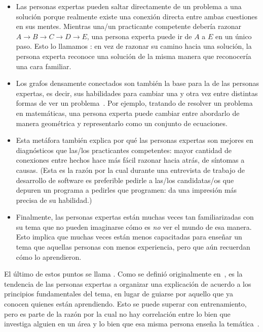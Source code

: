 \begin{itemize}

\item
  Las personas expertas pueden saltar directamente de un problema a una solución
  porque realmente existe una conexión directa entre ambas cuestiones en sus mentes.
  Mientras una/un practicante competente debería razonar
  $A{\rightarrow}B{\rightarrow}C{\rightarrow}D{\rightarrow}E$,
  una persona experta puede ir de $A$ a $E$ en un único paso.
  Esto lo llamamos :
  en vez de razonar su camino hacia una solución,
  la persona experta reconoce una solución de la misma manera que reconocería una cara familiar.

\item
  Los grafos densamente conectados son también la base para la 
   de las personas expertas,
 es decir, sus habilidades para cambiar una y otra vez entre distintas formas de ver un problema~\cite{Petr2016}.
  Por ejemplo,
  tratando de resolver un problema en matemáticas,
  una persona experta puede cambiar entre abordarlo de manera geométrica 
  y representarlo como un conjunto de ecuaciones.

\item
  Esta metáfora también explica por qué las personas expertas son mejores en diagnósticos que las/los practicantes competentes:
 mayor cantidad de conexiones entre hechos hace más fácil razonar hacia atrás, de síntomas a causas.
  (Esta es la razón por la cual durante una entrevista de trabajo de desarrollo de software es 
  preferible pedirle a las/los candidatas/os que depuren un programa a pedirles que programen: 
  da una impresión más precisa de su habilidad.)

\item
  Finalmente,
  las personas expertas están muchas veces tan familiarizadas con su tema que
  no pueden imaginarse cómo es \emph{no} ver el mundo de esa manera.
  Esto implica que muchas veces están menos capacitadas para enseñar un tema que aquellas personas con menos experiencia, 
  pero que aún recuerdan cómo lo aprendieron.

\end{itemize}

El último de estos puntos se llama .
Como se definió originalmente en~\cite{Nath2003},
es la tendencia de las personas expertas a organizar una explicación de acuerdo a los principios fundamentales del tema,
en lugar de guiarse por aquello que ya conocen quienes están aprendiendo.
Esto se puede superar con entrenamiento,
pero es parte de la razón por la cual no hay correlación entre
lo bien que investiga alguien en un área
y lo bien que esa misma persona enseña la temática~\cite{Mars2002}.

